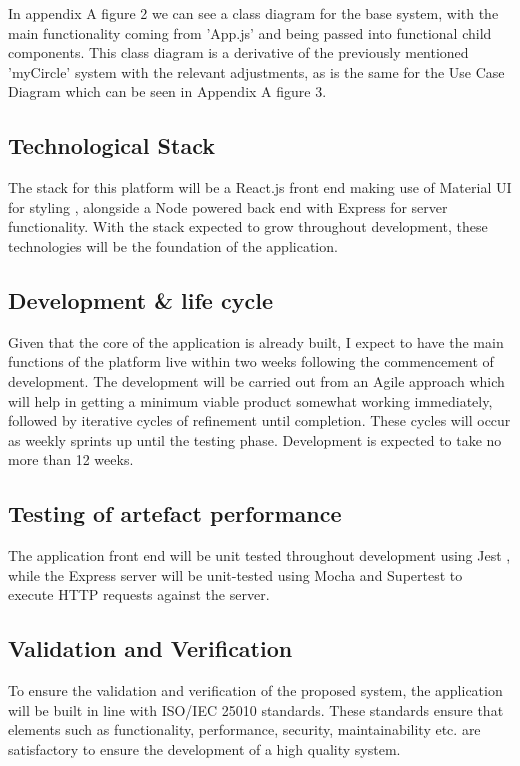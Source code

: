 \documentclass[lettersize,journal]{IEEEtran}
\begin{document}
	In appendix A figure 2 we can see a class diagram for the base system, with the main functionality coming from 'App.js' and being passed into
	functional child components. This class diagram is a derivative of the previously mentioned 'myCircle' system with the relevant adjustments,
	as is the same for the Use Case Diagram which can be seen in Appendix A figure 3.

	\subsection{Technological Stack}
	The stack for this platform will be a React.js front end \cite{React} making use of Material UI for
    styling \cite{Mui}, alongside a Node powered back end \cite{Node} with Express for server
    functionality\cite{Express}. With the stack expected to grow throughout development, these technologies will be the foundation of the application.

	\subsection{Development \& life cycle}
		Given that the core of the application is already built, I expect to have the main functions of the platform live within two weeks following
		the commencement
		of development. The development will be carried out from an Agile approach \cite{Agile} which will help in getting a minimum viable product somewhat working 
		immediately, followed by iterative cycles of refinement until completion. These cycles will occur as weekly sprints up until the testing phase.
		Development is expected to take no more than 12 weeks.

	\subsection{Testing of artefact performance}
	The application front end will be unit tested throughout development using Jest \cite{Jest}, while the Express server will be unit-tested using Mocha \cite{Mocha}
	and Supertest \cite{SuperTest} to execute HTTP requests against the server.

	\subsection{Validation and Verification}
	
	To ensure the validation and verification of the proposed system, the application will be built in line with ISO/IEC 25010 \cite{ISO25000} standards.
	These standards ensure that elements such as functionality, performance, security, maintainability etc. are satisfactory to ensure the development of a high quality system.
\end{document}
